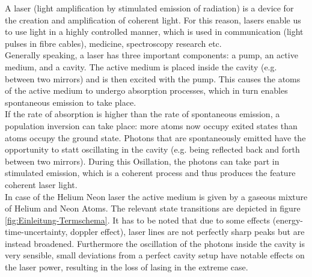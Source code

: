 \documentclass[../main.tex]{subfiles}
\begin{document}
    A laser (light amplification by stimulated emission of radiation) is a device for the creation and amplification of  coherent light. For this reason, lasers enable us to use light in a highly controlled manner, which is used in communication (light pulses in fibre cables), medicine, spectroscopy research etc.\\ 

    \noindent Generally speaking, a laser has three important components: a pump, an active medium, and a cavity. The active medium is placed inside the cavity (e.g. between two mirrors) and is then excited with the pump. This causes the atoms of the active medium to undergo absorption processes, which in turn enables spontaneous emission to take place.\\

    \noindent If the rate of absorption is higher than the rate of spontaneous emission, a population inversion can take place: more atoms now occupy exited states than atoms occupy the ground state. Photons that are spontaneously emitted have the opportunity to statt oscillating in the cavity (e.g. being reflected back and forth between two mirrors). During this Osillation, the photons can take part in stimulated emission, which is a coherent process and thus produces the feature coherent laser light.\\

    \noindent In case of the Helium Neon laser the active medium is given by a gaseous mixture of Helium and Neon Atoms. The relevant state transitions are depicted in figure \ref{fig:Einleitung-Termschema}. It has to be noted that due to some effects (energy-time-uncertainty, doppler effect), laser lines are not perfectly sharp peaks but are instead broadened. Furthermore the oscillation of the photons inside the cavity is very sensible, small deviations from a perfect cavity setup have notable effects on the laser power, resulting in the loss of lasing in the extreme case.
\end{document}
